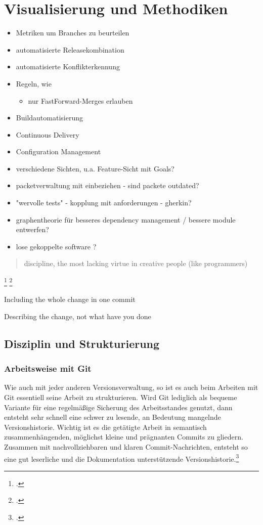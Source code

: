 \chapter{Visualisierung und Methodiken}
\label{ch:visu_meth}

\begin{itemize}
\item Metriken um Branches zu beurteilen
\item automatisierte Releasekombination
\item automatisierte Konflikterkennung
\item Regeln, wie 
	\begin{itemize}
		\item nur FastForward-Merges erlauben
	\end{itemize}	 
\item Buildautomatisierung
\item Continuous Delivery
\item Configuration Management
\item verschiedene Sichten, u.a. Feature-Sicht mit Goals?
\item packetverwaltung mit einbeziehen - sind packete outdated?
\item "wervolle tests" - kopplung mit anforderungen - gherkin?
\item graphentheorie für besseres dependency management / bessere module entwerfen?
\item lose gekoppelte software ?
\end{itemize}

\blockquote {discipline, the most lacking virtue in creative people (like programmers)}
\footcite[Making only one change per commit][]{git-essentials-2017}
\footcite[Writing commit messages before starting to code][]{git-essentials-2017}

Including the whole change in one commit

Describing the change, not what have you done



\section{Disziplin und Strukturierung}
\subsection{Arbeitsweise mit Git}

Wie auch mit jeder anderen Versionsverwaltung, so ist es auch beim Arbeiten mit Git essentiell seine Arbeit zu strukturieren. Wird Git lediglich als bequeme Variante für eine regelmäßige Sicherung des Arbeitsstandes genutzt, dann entsteht sehr schnell eine schwer zu lesende, an Bedeutung mangelnde Versionshistorie. Wichtig ist es die getätigte Arbeit in semantisch zusammenhängenden, möglichst kleine und prägnanten Commits zu gliedern.
Zusammen mit nachvollziehbaren und klaren Commit-Nachrichten, entsteht so eine gut leserliche und die Dokumentation unterstützende Versionshistorie.\footcite[Making only one change per commit][]{git-essentials-2017}